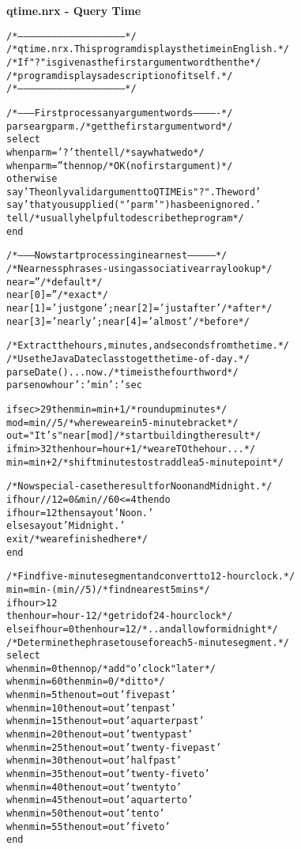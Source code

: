\index{,}
\textbf{qtime.nrx - Query Time}
\begin{alltt}
/*--------------------------------------------------------*/
/* qtime.nrx.  This program displays the time in English. */
/* If "?" is given as the first argument word then the    */
/* program displays a description of itself.              */
/*--------------------------------------------------------*/

/*--------- First process any argument words -------------*/
parse arg parm .           /* get the first argument word */
select
  when parm='?' then tell               /* say what we do */
  when parm=''  then nop        /* OK (no first argument) */
  otherwise
    say 'The only valid argument to QTIME is "?".  The word'
    say 'that you supplied ("'parm'") has been ignored.'
    tell       /* usually helpful to describe the program */
  end

/*-------- Now start processing in earnest ---------------*/
/* Nearness phrases - using associative array lookup      */
near=''                                        /* default */
near[0]=''                                       /* exact */
near[1]=' just gone';  near[2]=' just after'     /* after */
near[3]=' nearly';     near[4]=' almost'        /* before */

/* Extract the hours, minutes, and seconds from the time. */
/* Use the Java Date class to get the time-of-day.        */
parse Date() . . . now .       /* time is the fourth word */
parse now hour':'min':'sec

if sec>29 then min=min+1              /* round up minutes */
mod=min//5            /* where we are in 5-minute bracket */
out="It's"near[mod]          /* start building the result */
if min>32 then hour=hour+1       /* we are TO the hour... */
min=min+2   /* shift minutes to straddle a 5-minute point */

/* Now special-case the result for Noon and Midnight.     */
if hour//12=0 & min//60<=4 then do
  if hour=12 then say out 'Noon.'
             else say out 'Midnight.'
  exit                            /* we are finished here */
  end

/* Find five-minute segment and convert to 12-hour clock. */
min=min-(min//5)                   /* find nearest 5 mins */
if hour>12
 then hour=hour-12            /* get rid of 24-hour clock */
 else if hour=0 then hour=12 /* .. and allow for midnight */
/* Determine the phrase to use for each 5-minute segment. */
select
  when min= 0 then nop             /* add "o'clock" later */
  when min=60 then min=0                         /* ditto */
  when min= 5 then out=out 'five past'
  when min=10 then out=out 'ten past'
  when min=15 then out=out 'a quarter past'
  when min=20 then out=out 'twenty past'
  when min=25 then out=out 'twenty-five past'
  when min=30 then out=out 'half past'
  when min=35 then out=out 'twenty-five to'
  when min=40 then out=out 'twenty to'
  when min=45 then out=out 'a quarter to'
  when min=50 then out=out 'ten to'
  when min=55 then out=out 'five to'
  end


\end{alltt}

